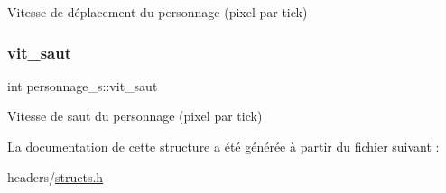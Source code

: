 Vitesse de déplacement du personnage (pixel par tick) \mbox{\label{structpersonnage__s_abf199b160e1ce327b7def1ed1ee00b39}} 
\subsubsection{\texorpdfstring{vit\+\_\+saut}{vit\_saut}}
{\footnotesize\ttfamily int personnage\+\_\+s\+::vit\+\_\+saut}

Vitesse de saut du personnage (pixel par tick) 

La documentation de cette structure a été générée à partir du fichier suivant \+:\begin{DoxyCompactItemize}
\item 
headers/\hyperlink{structs_8h}{structs.\+h}\end{DoxyCompactItemize}
